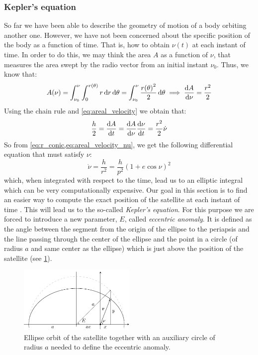 \documentclass[../main.tex]{subfiles}
\begin{document}
\subsubsection{Kepler's equation}\label{sec:kepler_equation}
So far we have been able to describe the geometry of motion of a body orbiting another one. However, we have not been concerned about the specific position of the body as a function of time. That is, how to obtain $\nu(t)$ at each instant of time. In order to do this, we may think the area $A$ as a function of $\nu$, that measures the area swept by the radio vector from an initial instant $\nu_0$. Thus, we know that:
\begin{equation}
  A(\nu)=\int_{\nu_0}^{\nu}\int_{0}^{r(\theta)}r\dd{r}\dd{\theta}=\int_{\nu_0}^{\nu}\frac{{r(\theta)}^2}{2}\dd{\theta}\implies\dv{A}{\nu}=\frac{r^2}{2}
\end{equation}
Using the chain rule and \cref{eq:areal_velocity} we obtain that:
\begin{equation}\label{eq:areal_velocity_nu}
  \frac{h}{2}=\dv{A}{t}=\dv{A}{\nu}\dv{\nu}{t}=\frac{r^2}{2}\dot\nu
\end{equation}
So from \cref{eq:r_conic,eq:areal_velocity_nu}, we get the following differential equation that must satisfy $\nu$:
\begin{equation}
  \dot\nu=\frac{h}{r^2}=\frac{h}{p^2}{(1+e\cos\nu)}^2
\end{equation}
which, when integrated with respect to the time, lead us to an elliptic integral which can be very computationally expensive. Our goal in this section is to find an easier way to compute the exact position of the satellite at each instant of time \cite{montenbruck}. This will lead us to the so-called \emph{Kepler's equation}. For this purpose we are forced to introduce a new parameter, $E$, called \emph{eccentric anomaly}. It is defined as the angle between the segment from the origin of the ellipse to the periapsis and the line passing through the center of the ellipse and the point in a circle (of radius $a$ and same center as the ellipse) which is just above the position of the satellite (see \cref{fig:kepler_eq}).
\begin{figure}[ht]
  \centering
  \includegraphics[width=0.5\textwidth]{Images/kepler_eq.pdf}
  \caption{Ellipse orbit of the satellite together with an auxiliary circle of radius $a$ needed to define the eccentric anomaly.}
  \label{fig:kepler_eq}
\end{figure}
\end{document}
